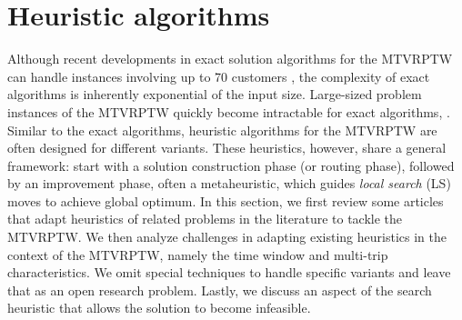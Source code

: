
\section{Heuristic algorithms}
\label{sec:heuristics}

Although recent developments in exact solution algorithms for the MTVRPTW can handle instances involving up to 70 customers \citep{yang2023exact}, the complexity of exact algorithms is inherently exponential of the input size.  Large-sized problem instances of the MTVRPTW quickly become intractable for exact algorithms, .  Similar to the exact algorithms, heuristic algorithms for the MTVRPTW are often designed for different variants.  These heuristics, however, share a general framework: start with a solution construction phase (or routing phase), followed by an improvement phase, often a metaheuristic, which guides \textit{local search} (LS) moves to achieve global optimum.    In this section, we first review some articles that adapt heuristics of related problems in the literature to tackle the MTVRPTW.  We then analyze challenges in adapting existing heuristics in the context of the MTVRPTW, namely the time window and multi-trip characteristics.  We omit special techniques to handle specific variants and leave that as an open research problem.  Lastly, we discuss an aspect of the search heuristic that allows the solution to become infeasible.
\newline


